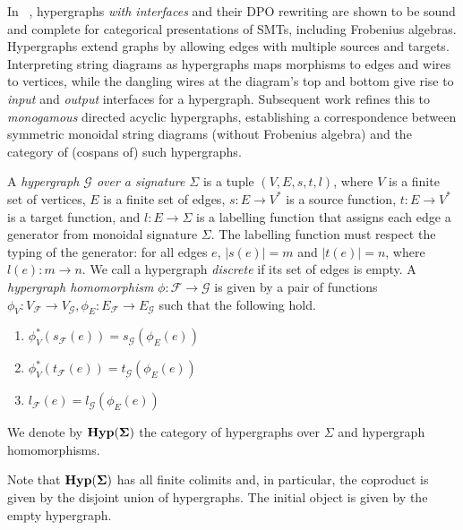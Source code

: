 In ~\cite{bonchi_string_2022-1}, hypergraphs \textit{with interfaces} and their DPO rewriting are shown to be sound and complete for categorical presentations of SMTs, including Frobenius algebras.
Hypergraphs extend graphs by allowing edges with multiple sources and targets. 
Interpreting string diagrams as hypergraphs maps morphisms to edges and wires to vertices, while the dangling wires at the diagram's top and bottom give rise to \textit{input} and \textit{output} interfaces for a hypergraph.
Subsequent work \cite{bonchi_string_2022-2} refines this to \textit{monogamous} directed acyclic hypergraphs, establishing a correspondence between symmetric monoidal string diagrams (without Frobenius algebra) and the category of (cospans of) such hypergraphs.

\begin{definition}\label{def:hypergraph}
A \emph{hypergraph $\mathcal{G}$ over a signature $\Sigma$} is a tuple $(V,E,s,t,l)$,  where $V$ is a finite set of vertices, $E$ is a finite set of edges, $s : E \to V^{*}$ is a source function, $t : E \to V^{*}$ is a target function,  and $l : E \to \Sigma$ is a labelling function that assigns each edge a generator from monoidal signature $\Sigma$.  The labelling function must respect the typing of the generator: for all edges $e$,  $|s(e)| = m$ and $|t(e)| = n$,  where $l(e) : m \to n$.  We call a hypergraph \textit{discrete} if its set of edges is empty.   
A \emph{hypergraph homomorphism} $\phi: \mathcal{F} \to \mathcal{G}$ is given by a pair of functions $\phi_V : V_{\mathcal{F}} \to V_{\mathcal{G}}, \phi_E : E_{\mathcal{F}} \to E_{\mathcal{G}}$ such that the following hold. 
\begin{enumerate}
    \vspace{-1.25mm}
    \item $\phi_V^*(s_{\mathcal{F}}(e)) = s_{\mathcal{G}}(\phi_E(e))$
    \item $\phi_V^*(t_{\mathcal{F}}(e)) = t_{\mathcal{G}}(\phi_E(e))$
    \item $l_{\mathcal{F}}(e) = l_{\mathcal{G}}(\phi_E(e))$
    \vspace{-0.5mm}
\end{enumerate}
We denote by $\mathbf{Hyp(\Sigma)}$ the category of hypergraphs over $\Sigma$ and hypergraph homomorphisms. 
\end{definition}
Note that $\mathbf{Hyp(\Sigma)}$ has all finite colimits and, in particular,  the coproduct is given by the disjoint union of hypergraphs.
The initial object is given by the empty hypergraph.  

